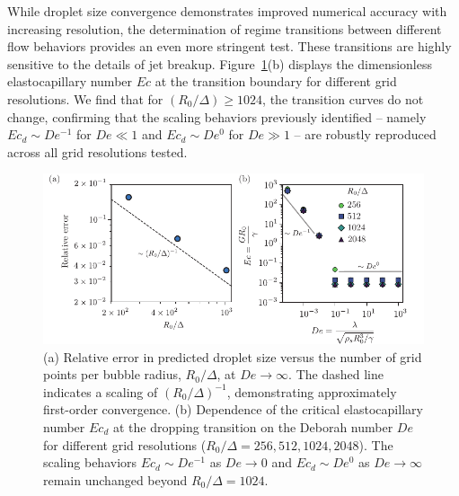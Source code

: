 \documentclass{jfm}
\newcommand{\oo}{\color{magenta} \normalfont}
\newcommand{\bb}{\color{black} \normalfont}
\begin{document}
While droplet size convergence demonstrates improved numerical accuracy with increasing resolution, the determination of regime transitions between different flow behaviors provides an even more stringent test. These transitions are highly sensitive to the details of jet breakup. Figure~\ref{fig:gis}(b) displays the dimensionless elastocapillary number $Ec$ at the transition boundary for different grid resolutions. We find that for $(R_0/\Delta) \geq 1024$, the transition curves do not change, confirming that the scaling behaviors previously identified -- namely $Ec_d \sim De^{-1}$ for $De \ll 1$ and $Ec_d \sim De^0$ for $De \gg 1$ -- are robustly reproduced across all grid resolutions tested.

\begin{figure}
	\centering
	\includegraphics[width=\textwidth]{Figures/gridConverge-eps-converted-to.pdf}
	\caption{{\oo (a) Relative error in predicted droplet size versus the number of grid points per bubble radius, $R_0/\Delta$, at $De \to \infty$. The dashed line indicates a scaling of $(R_0/\Delta)^{-1}$, demonstrating approximately first-order convergence. (b) Dependence of the critical elastocapillary number $Ec_d$ at the dropping transition on the Deborah number $De$ for different grid resolutions ($R_0/\Delta = 256, 512, 1024, 2048$). The scaling behaviors $Ec_d \sim De^{-1}$ as $De \to 0$ and $Ec_d \sim De^0$ as $De \to \infty$ remain unchanged beyond $R_0/\Delta = 1024$.\bb}}
	\label{fig:gis}
\end{figure}
\end{document}
